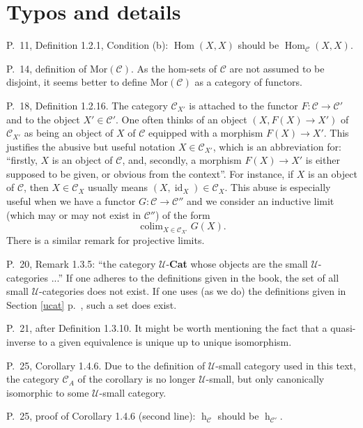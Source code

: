 \documentclass[12pt]{article}
\theoremstyle{remark}%
\newcommand{\n}{\noindent}
\newcommand{\C}{\mathcal C}
\newcommand{\U}{\mathcal U}
\DeclareMathOperator*{\coli}{colim}
\DeclareMathOperator{\hy}{h}
\DeclareMathOperator{\id}{id}
\DeclareMathOperator{\Hom}{Hom}
\begin{document}
\centerline{}
%
\section{Typos and details}%
%
P.~11, Definition 1.2.1, Condition (b): $\Hom(X,X)$ should be $\Hom_{\C}(X,X)$. 

\n P.~14, definition of $\text{Mor}(\C)$. As the hom-sets of $\C$ are not assumed to be disjoint, it seems better to define $\text{Mor}(\C)$ as a category of functors. 


\n P.~18, Definition 1.2.16. The category $\C_{X'}$ is attached to the functor $F:\C\to\C'$ and to the object $X'\in\C'$. One often thinks of an object $(X,F(X)\to X')$ of $\C_{X'}$ as being an object of $X$ of $\C$ equipped with a morphism $F(X)\to X'$. This justifies the abusive but useful notation $X\in\C_{X'}$, which is an abbreviation for: ``firstly, $X$ is an object of $\C$, and, secondly, a morphism $F(X)\to X'$ is either supposed to be given, or obvious from the context''. For instance, if $X$ is an object of $\C$, then $X\in\C_X$ usually means $(X,\id_X)\in\C_X$. This abuse is especially useful when we have a functor $G:\C\to\C''$ and we consider an inductive limit (which may or may not exist in $\C''$) of the form 
%
\begin{equation}\label{convnot}
\coli_{X\in\C_{X'}}G(X).  
\end{equation}
% 
There is a similar remark for projective limits. 


\n P.~20, Remark 1.3.5: ``the category $\U$-\textbf{Cat} whose objects are the small $\U$-categories ...'' If one adheres to the definitions given in the book, the set of all small $\U$-categories does not exist. If one uses (as we do) the definitions given in Section \ref{ucat} p.~\pageref{ucat}, such a set does exist. 

\n P.~21, after Definition 1.3.10. It might be worth mentioning the fact that a quasi-inverse to a given equivalence is unique up to unique isomorphism. 

\n P.~25, Corollary 1.4.6. Due to the definition of $\U$-small category used in this text, the category $\C_A$ of the corollary is no longer $\U$-small, but only canonically isomorphic to some $\U$-small category.

\n P.~25, proof of Corollary 1.4.6 (second line): $\hy_{\C}$ should be $\hy_{\C'}$. 
\end{document}
